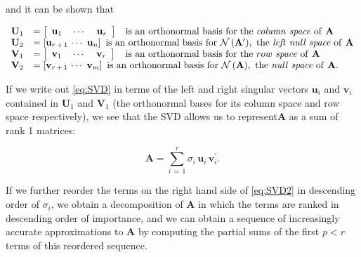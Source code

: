 \documentclass[graybox,envcountchap,sectrefs]{svmono}\usepackage[]{graphicx}\usepackage[]{xcolor}
\begin{document}
\begin{appendices}
and it can be shown that

\[
\begin{array}{cl}
\mathbf{U}_{1} & =\left[\begin{array}{ccc}
\mathrm{\mathbf{u}}_{1} & \,\cdots\  & \mathrm{\mathbf{u}}_{r}\end{array}\right]\hspace{0.315cm}\mathrm{is\ an\ orthonormal\boldsymbol{\ }basis\ for\ the\ \mathit{\mathit{column}\ space}\ of\ \mathbf{\mathbf{A}}}\\
\mathbf{U}_{2} & =\left[\mathrm{\mathbf{u}}_{r\,+\,1}\,\cdots\ \mathrm{\mathbf{u}}_{n}\right]\hspace{0.12cm}\mathrm{is\ an\ orthonormal\boldsymbol{\ }basis\ for\ \mathbf{\mathcal{{N}}\left(\mathrm{\mathbf{A}}^{\prime}\right)},\ the\ \mathit{left\ null\ space}\ of}\ \mathrm{\mathbf{A}}\\
\mathbf{V}_{1} & =\left[\begin{array}{ccc}
\mathrm{\mathbf{v}}_{1} & \,\cdots\  & \mathrm{\mathbf{v}}_{r}\end{array}\right]\hspace{0.335cm}\mathrm{is\ an\ orthonormal\boldsymbol{\ }basis\ for\ the}\ row\ \mathit{space}\ \mathrm{of}\ \mathbf{\mathbf{A}}\\
\mathbf{V}_{2} & =\left[\mathrm{\mathbf{v}}_{r\,+\,1}\,\cdots\ \mathrm{\mathbf{v}}_{m}\right]\ \mathrm{is\ an\ orthonormal\boldsymbol{\ }basis\ for\ \mathbf{\mathcal{{N}}\left(\mathrm{\mathbf{A}}\right)},\ the}\ \mathit{null\ space}\ \mathrm{of}\ \mathbf{A}.
\end{array}
\]

If we write out \eqref{eq:SVD} in terms of the left and right singular
vectors $\mathrm{\mathbf{u}}_{i}$ and $\mathrm{\mathbf{v}}_{i}$
contained in $\mathbf{U}_{1}$ and $\mathbf{V}_{1}$ (the orthonormal
bases for its column space and row space respectively), we see that
the SVD allows us to represent$\mathrm{\mathbf{A}}$ as a sum of rank
1 matrices:

\begin{equation}
\mathbf{\mathbf{A}}=\sum_{i\,=\,1}^{r}\sigma_{i}\,\mathrm{\mathbf{u}}_{i}\,\mathbf{v}_{i}^{\prime}.\label{eq:SVD2}
\end{equation}

If we further reorder the terms on the right hand side of \eqref{eq:SVD2}
in descending order of $\sigma_{i}$, we obtain a decomposition of
$\mathrm{\mathbf{A}}$ in which the terms are ranked in descending
order of importance, and we can obtain a sequence of increasingly
accurate approximations to $\mathrm{\mathbf{A}}$ by computing the
partial sums of the first $p<r$ terms of this reordered sequence. 


\end{appendices}
\end{document}

